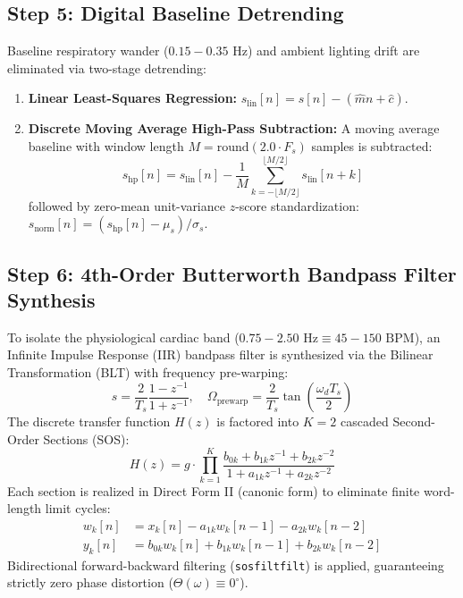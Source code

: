 \documentclass[11pt,a4paper]{report}
\begin{document}
\subsection{Step 5: Digital Baseline Detrending}
Baseline respiratory wander ($0.15 - 0.35\text{ Hz}$) and ambient lighting drift are eliminated via two-stage detrending:
\begin{enumerate}
    \item \textbf{Linear Least-Squares Regression:} $s_{\text{lin}}[n] = s[n] - (\hat{m} n + \hat{c})$.
    \item \textbf{Discrete Moving Average High-Pass Subtraction:} A moving average baseline with window length $M = \text{round}(2.0 \cdot F_s)$ samples is subtracted:
    \begin{equation}
        s_{\text{hp}}[n] = s_{\text{lin}}[n] - \frac{1}{M} \sum_{k = -\lfloor M/2 \rfloor}^{\lfloor M/2 \rfloor} s_{\text{lin}}[n + k]
    \end{equation}
    followed by zero-mean unit-variance $z$-score standardization: $s_{\text{norm}}[n] = (s_{\text{hp}}[n] - \mu_s) / \sigma_s$.
\end{enumerate}

\subsection{Step 6: 4th-Order Butterworth Bandpass Filter Synthesis}
To isolate the physiological cardiac band ($0.75 - 2.50\text{ Hz} \equiv 45 - 150\text{ BPM}$), an Infinite Impulse Response (IIR) bandpass filter is synthesized via the Bilinear Transformation (BLT) with frequency pre-warping:
\begin{equation}
    s = \frac{2}{T_s} \frac{1 - z^{-1}}{1 + z^{-1}}, \quad \Omega_{\text{prewarp}} = \frac{2}{T_s} \tan\left( \frac{\omega_d T_s}{2} \right)
\end{equation}
The discrete transfer function $H(z)$ is factored into $K=2$ cascaded Second-Order Sections (SOS):
\begin{equation}
    H(z) = g \cdot \prod_{k=1}^{K} \frac{b_{0k} + b_{1k} z^{-1} + b_{2k} z^{-2}}{1 + a_{1k} z^{-1} + a_{2k} z^{-2}}
\end{equation}
Each section is realized in Direct Form II (canonic form) to eliminate finite word-length limit cycles:
\begin{align}
    w_k[n] &= x_k[n] - a_{1k} w_k[n-1] - a_{2k} w_k[n-2] \\
    y_k[n] &= b_{0k} w_k[n] + b_{1k} w_k[n-1] + b_{2k} w_k[n-2]
\end{align}
Bidirectional forward-backward filtering (\texttt{sosfiltfilt}) is applied, guaranteeing strictly zero phase distortion ($\Theta(\omega) \equiv 0^\circ$).
\end{document}
